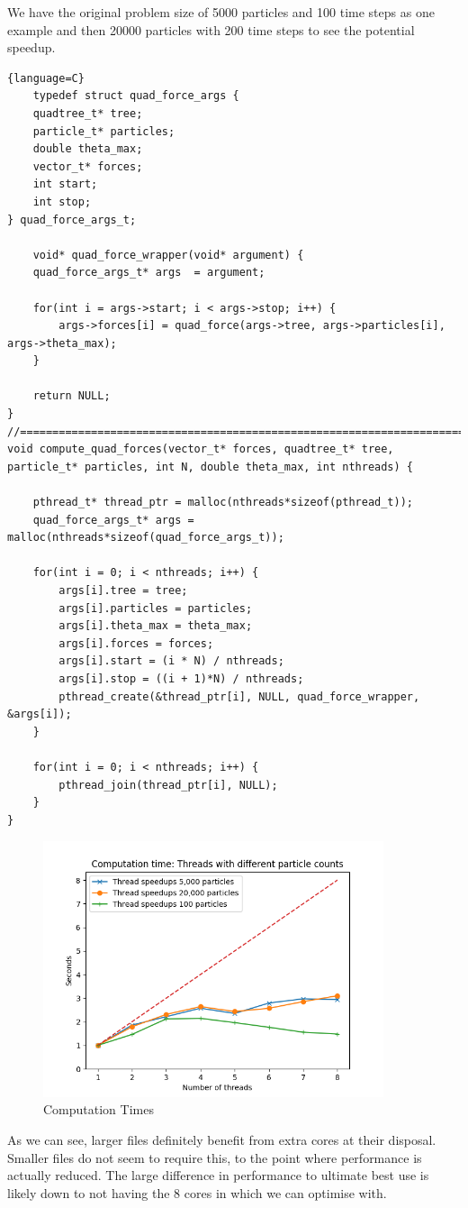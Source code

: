 We have the original problem size of 5000 particles and 100 time steps as one example and then 20000 particles with 200 time steps to see the potential speedup.
\begin{lstlisting}{language=C}
    typedef struct quad_force_args {
    quadtree_t* tree;
    particle_t* particles;
    double theta_max;
    vector_t* forces;
    int start;
    int stop;
} quad_force_args_t;

    void* quad_force_wrapper(void* argument) {
    quad_force_args_t* args  = argument;

    for(int i = args->start; i < args->stop; i++) {
        args->forces[i] = quad_force(args->tree, args->particles[i], args->theta_max);
    }

    return NULL;
}
//===========================================================================
void compute_quad_forces(vector_t* forces, quadtree_t* tree, particle_t* particles, int N, double theta_max, int nthreads) {

    pthread_t* thread_ptr = malloc(nthreads*sizeof(pthread_t));
    quad_force_args_t* args = malloc(nthreads*sizeof(quad_force_args_t));

    for(int i = 0; i < nthreads; i++) {
        args[i].tree = tree;
        args[i].particles = particles;
        args[i].theta_max = theta_max;
        args[i].forces = forces;
        args[i].start = (i * N) / nthreads;
        args[i].stop = ((i + 1)*N) / nthreads;
        pthread_create(&thread_ptr[i], NULL, quad_force_wrapper, &args[i]);
    }

    for(int i = 0; i < nthreads; i++) {
        pthread_join(thread_ptr[i], NULL);
    }
}
\end{lstlisting}
\newpage
\begin{figure}[htb]
    \begin{center}
        \includegraphics[width = 10cm]{../images/compute_times.jpg}
        \caption{Computation Times}
    \end{center}
\end{figure}
As we can see, larger files definitely benefit from extra cores at their disposal. Smaller files do not seem to require this, to the point where performance is actually reduced. The large difference in performance to ultimate best use is likely down to not having the 8 cores in which we can optimise with.
